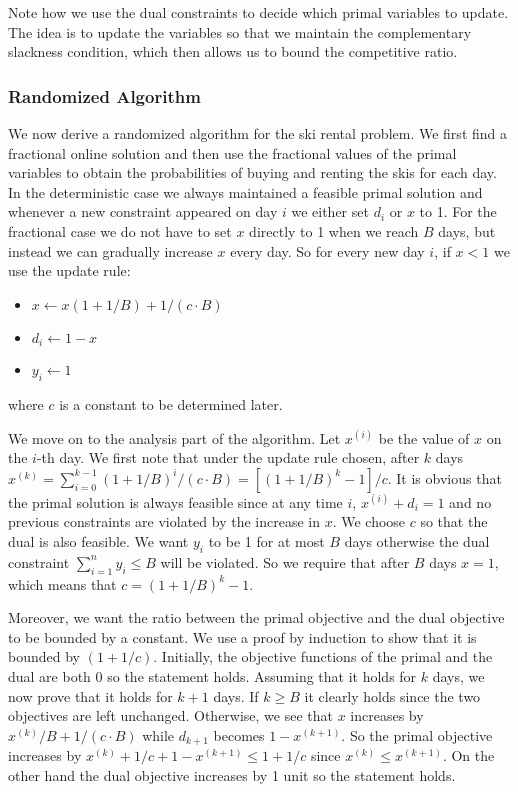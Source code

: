 Note how we use the dual constraints to decide which primal variables to update.
The idea is to update the variables so that we maintain the complementary slackness condition, which then allows us to bound the competitive ratio.

\subsubsection{Randomized Algorithm}
We now derive a randomized algorithm for the ski rental problem. 
We first find a fractional online solution and then use the fractional values of the primal variables to obtain the probabilities of buying and renting the skis for each day.
In the deterministic case we always maintained a feasible primal solution and whenever a new constraint appeared on day $i$ we either set $d_i$ or $x$ to 1. For the fractional case we do not have to set $x$ directly to 1 when we reach $B$ days, but instead we can gradually increase $x$ every day. So for every new day $i$, if $x<1$ we use the update rule:
\begin{itemize}
\item $x \leftarrow x(1+1/B) + 1/(c\cdot B)$
\item $d_i \leftarrow 1 - x$
\item $y_i \leftarrow 1$
\end{itemize}
where $c$ is a constant to be determined later.

We move on to the analysis part of the algorithm. Let $x^{(i)}$ be the value of $x$ on the $i$-th day. We first note that under the update rule chosen, after $k$ days $x^{(k)} =  \sum_{i=0}^{k-1} (1+1/B)^i / (c\cdot B) = [(1+1/B)^k-1]/c$. It is obvious that the primal solution is always feasible since at any time $i$, $x^{(i)}+d_i=1$ and no previous constraints are violated by the increase in $x$. We choose $c$ so that the dual is also feasible. We want $y_i$ to be 1 for at most $B$ days otherwise the dual constraint  $\sum^n_{i=1} y_i \le B$ will be violated. So we require that after $B$ days $x = 1$, which means that $c = (1+1/B)^k-1$.

Moreover, we want the ratio between the primal objective and the dual objective to be bounded by a constant.
We use a proof by induction to show that it is bounded by $(1+1/c)$.
Initially, the objective functions of the primal and the dual are both 0 so the statement holds.
Assuming that it holds for $k$ days, we now prove that it holds for $k+1$ days.
If $k\ge B$ it clearly holds since the two objectives are left unchanged.
Otherwise, we see that $x$ increases by $x^{(k)} / B + 1/(c \cdot B)$ while $d_{k+1}$ becomes $1 - x^{(k+1)}$.
So the primal objective increases by $x^{(k)} + 1/c + 1 - x^{(k+1)} \le 1 + 1/c$ since $x^{(k)} \le x^{(k+1)}$.
On the other hand the dual objective increases by 1 unit so the statement holds.

